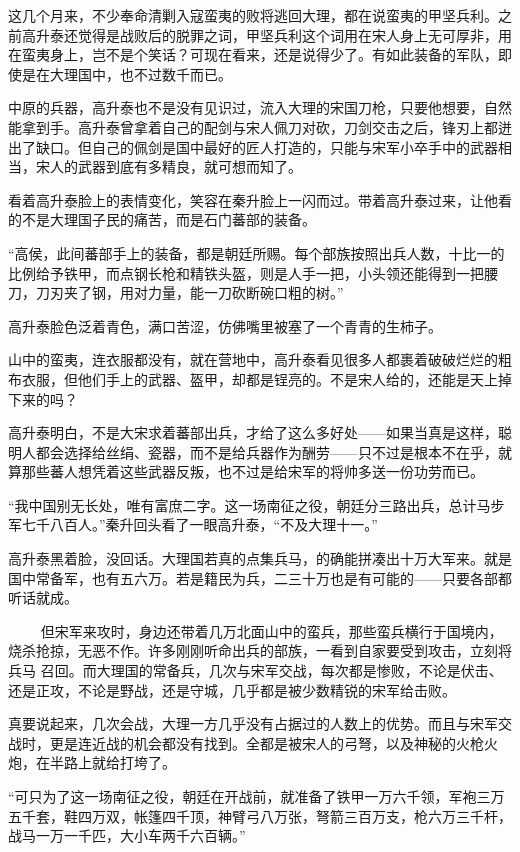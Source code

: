 这几个月来，不少奉命清剿入寇蛮夷的败将逃回大理，都在说蛮夷的甲坚兵利。之前高升泰还觉得是战败后的脱罪之词，甲坚兵利这个词用在宋人身上无可厚非，用在蛮夷身上，岂不是个笑话？可现在看来，还是说得少了。有如此装备的军队，即使是在大理国中，也不过数千而已。

中原的兵器，高升泰也不是没有见识过，流入大理的宋国刀枪，只要他想要，自然能拿到手。高升泰曾拿着自己的配剑与宋人佩刀对砍，刀剑交击之后，锋刃上都迸出了缺口。但自己的佩剑是国中最好的匠人打造的，只能与宋军小卒手中的武器相当，宋人的武器到底有多精良，就可想而知了。

看着高升泰脸上的表情变化，笑容在秦升脸上一闪而过。带着高升泰过来，让他看的不是大理国子民的痛苦，而是石门蕃部的装备。

“高侯，此间蕃部手上的装备，都是朝廷所赐。每个部族按照出兵人数，十比一的比例给予铁甲，而点钢长枪和精铁头盔，则是人手一把，小头领还能得到一把腰刀，刀刃夹了钢，用对力量，能一刀砍断碗口粗的树。”

高升泰脸色泛着青色，满口苦涩，仿佛嘴里被塞了一个青青的生柿子。

山中的蛮夷，连衣服都没有，就在营地中，高升泰看见很多人都裹着破破烂烂的粗布衣服，但他们手上的武器、盔甲，却都是锃亮的。不是宋人给的，还能是天上掉下来的吗？

高升泰明白，不是大宋求着蕃部出兵，才给了这么多好处——如果当真是这样，聪明人都会选择给丝绢、瓷器，而不是给兵器作为酬劳——只不过是根本不在乎，就算那些蕃人想凭着这些武器反叛，也不过是给宋军的将帅多送一份功劳而已。

“我中国别无长处，唯有富庶二字。这一场南征之役，朝廷分三路出兵，总计马步军七千八百人。”秦升回头看了一眼高升泰，“不及大理十一。”

高升泰黑着脸，没回话。大理国若真的点集兵马，的确能拼凑出十万大军来。就是国中常备军，也有五六万。若是籍民为兵，二三十万也是有可能的——只要各部都听话就成。

　
　但宋军来攻时，身边还带着几万北面山中的蛮兵，那些蛮兵横行于国境内，烧杀抢掠，无恶不作。许多刚刚听命出兵的部族，一看到自家要受到攻击，立刻将兵马
召回。而大理国的常备兵，几次与宋军交战，每次都是惨败，不论是伏击、还是正攻，不论是野战，还是守城，几乎都是被少数精锐的宋军给击败。

真要说起来，几次会战，大理一方几乎没有占据过的人数上的优势。而且与宋军交战时，更是连近战的机会都没有找到。全都是被宋人的弓弩，以及神秘的火枪火炮，在半路上就给打垮了。

“可只为了这一场南征之役，朝廷在开战前，就准备了铁甲一万六千领，军袍三万五千套，鞋四万双，帐篷四千顶，神臂弓八万张，弩箭三百万支，枪六万三千杆，战马一万一千匹，大小车两千六百辆。”


